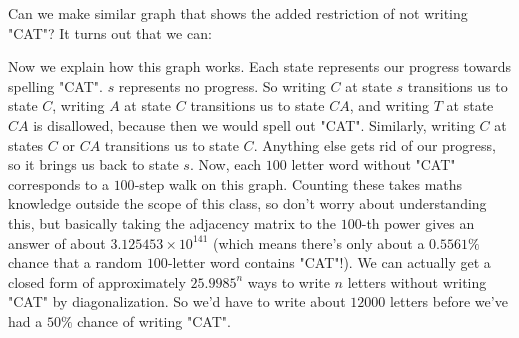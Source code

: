 \documentclass[12pt]{article}
\begin{document}

Can we make similar graph that shows the added restriction of not writing "CAT"? It turns out that we can:


Now we explain how this graph works. Each state represents our progress towards spelling "CAT". $s$ represents no progress. So writing $C$ at state $s$ transitions us to state $C$, writing $A$ at state $C$ transitions us to state $CA$, and writing $T$ at state $CA$ is disallowed, because then we would spell out "CAT". Similarly, writing $C$ at states $C$ or $CA$ transitions us to state $C$. Anything else gets rid of our progress, so it brings us back to state $s$. Now, each $100$ letter word without "CAT" corresponds to a $100$-step walk on this graph. Counting these takes maths knowledge outside the scope of this class, so don't worry about understanding this, but basically taking the adjacency matrix to the $100$-th power gives an answer of about $3.125453\times 10^{141}$ (which means there's only about a $0.5561\%$ chance that a random $100$-letter word contains "CAT"!). We can actually get a closed form of approximately $25.9985^n$ ways to write $n$ letters without writing "CAT" by diagonalization. So we'd have to write about $12000$ letters before we've had a $50\%$ chance of writing "CAT".
\end{document}
